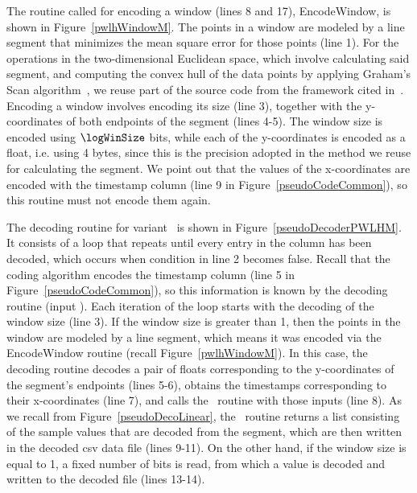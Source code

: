 The routine called for encoding a window (lines 8 and 17), EncodeWindow, is shown in Figure~\ref{pwlhWindowM}. The points in a window are modeled by a line segment that minimizes the mean square error for those points (line 1). For the operations in the two-dimensional Euclidean space, which involve calculating said segment, and computing the convex hull of the data points by applying Graham's Scan algorithm~\cite{GrahamAlgo}, we reuse part of the source code from the framework cited in~\cite{AnEva2013}. Encoding a window involves encoding its size (line 3), together with the y-coordinates of both endpoints of the segment (lines 4-5). The window size is encoded using $\logWinSize$ bits, while each of the y-coordinates is encoded as a float, i.e. using 4 bytes, since this is the precision adopted in the method we reuse for calculating the segment. We point out that the values of the x-coordinates are encoded with the timestamp column (line 9 in Figure~\ref{pseudoCodeCommon}), so this routine must not encode them again. 





\clearpage


The decoding routine for variant \maskalgo\ is shown in Figure~\ref{pseudoDecoderPWLHM}. It consists of a loop that repeats until every entry in the column has been decoded, which occurs when condition in line 2 becomes false. Recall that the coding algorithm encodes the timestamp column (line 5 in Figure~\ref{pseudoCodeCommon}), so this information is known by the decoding routine (input \tscol). Each iteration of the loop starts with the decoding of the window size (line 3). If the window size is greater than 1, then the points in the window are modeled by a line segment, which means it was encoded via the EncodeWindow routine (recall Figure~\ref{pwlhWindowM}). In this case, the decoding routine decodes a pair of floats corresponding to the y-coordinates of the segment's endpoints (lines 5-6), obtains the timestamps corresponding to their x-coordinates (line 7), and calls the \decodeSegment\ routine with those inputs (line 8). As we recall from Figure~\ref{pseudoDecoLinear}, the \decodeSegment\ routine returns a list consisting of the sample values that are decoded from the segment, which are then written in the decoded csv data file (lines 9-11). On the other hand, if the window size is equal to 1, a fixed number of bits is read, from which a value is decoded and written to the decoded file (lines 13-14).



